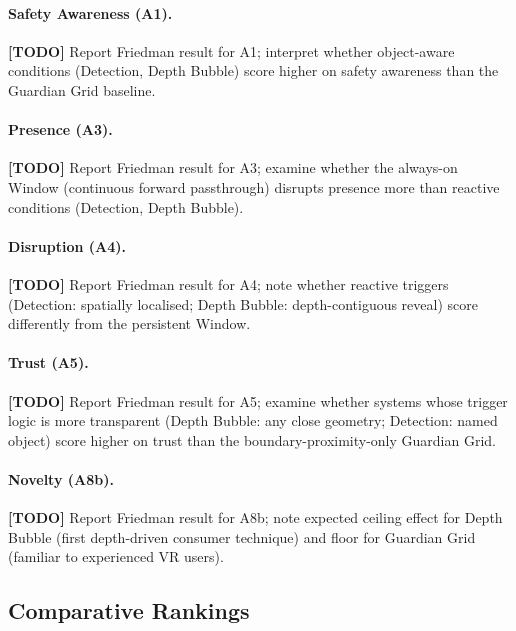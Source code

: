 \documentclass{styling/vgtc} %
\begin{document}
\paragraph{Safety Awareness (A1).}
\textbf{[TODO]} Report Friedman result for A1; interpret whether
object-aware conditions (Detection, Depth Bubble) score higher on
safety awareness than the Guardian Grid baseline.

\paragraph{Presence (A3).}
\textbf{[TODO]} Report Friedman result for A3; examine whether the
always-on Window (continuous forward passthrough) disrupts presence
more than reactive conditions (Detection, Depth Bubble).

\paragraph{Disruption (A4).}
\textbf{[TODO]} Report Friedman result for A4; note whether reactive
triggers (Detection: spatially localised; Depth Bubble: depth-contiguous
reveal) score differently from the persistent Window.

\paragraph{Trust (A5).}
\textbf{[TODO]} Report Friedman result for A5; examine whether
systems whose trigger logic is more transparent (Depth Bubble: any
close geometry; Detection: named object) score higher on trust than
the boundary-proximity-only Guardian Grid.

\paragraph{Novelty (A8b).}
\textbf{[TODO]} Report Friedman result for A8b; note expected ceiling
effect for Depth Bubble (first depth-driven consumer technique) and
floor for Guardian Grid (familiar to experienced VR users).


\subsection{Comparative Rankings}
\end{document}
